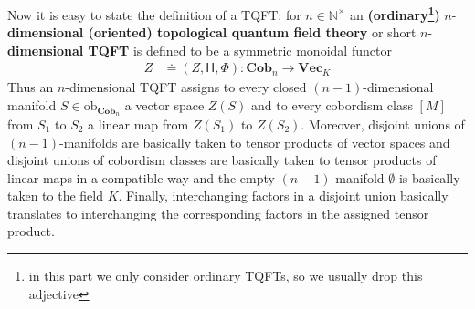 \nocite{0a816f4c}
Now it is easy to state the definition of a TQFT: for $n \in \mathbb{N}^{\times}$ an \textbf{(ordinary\footnote{in this part we only consider ordinary TQFTs, so we usually drop this adjective})} $n$-\textbf{dimensional (oriented) topological quantum field theory} or short $n$-\textbf{dimensional TQFT} is defined to be a symmetric monoidal functor
\begin{align*}
  Z
  &\doteq
  (Z,\mathsf{H},\Phi)
  \colon
  \mathbf{Cob}_{n}
  \to
  \mathbf{Vec}_{K}
\end{align*}
Thus an $n$-dimensional TQFT assigns to every closed $(n-1)$-dimensional manifold $S \in \mathrm{ob}_{\mathbf{Cob}_{n}}$ a vector space $Z(S)$ and to every cobordism class $[M]$ from $S_{1}$ to $S_{2}$ a linear map from $Z(S_{1})$ to $Z(S_{2})$. Moreover, disjoint unions of $(n-1)$-manifolds are basically taken to tensor products of vector spaces and disjoint unions of cobordism classes are basically taken to tensor products of linear maps in a compatible way and the empty $(n-1)$-manifold $\emptyset$ is basically taken to the field $K$. Finally, interchanging factors in a disjoint union basically translates to interchanging the corresponding factors in the assigned tensor product.

